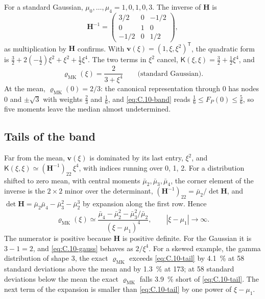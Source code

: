 For a standard Gaussian, $\mu_0, \dots, \mu_4 = 1, 0, 1, 0, 3$. The inverse of $\mathbf{H}$ is
\begin{equation*}
  \mathbf{H}^{-1} = \begin{pmatrix} 3/2 & 0 & -1/2\\ 0 & 1 & 0\\ -1/2 & 0 & 1/2 \end{pmatrix} ,
\end{equation*}
as multiplication by $\mathbf{H}$ confirms. With $\mathbf{v}(\xi) = (1, \xi, \xi^2)^{\mathsf{T}}$, the quadratic form is $\tfrac32 + 2(-\tfrac12)\xi^2 + \xi^2 + \tfrac12\xi^4$. The two terms in $\xi^2$ cancel, $\mathsf{K}(\xi,\xi) = \tfrac32 + \tfrac12\xi^4$, and
\begin{equation}
  \varrho_{\mathrm{MK}}(\xi) = \frac{2}{3 + \xi^4} \qquad \text{(standard Gaussian)} .
  \label{eq:C.10-gauss}
\end{equation}
At the mean, $\varrho_{\mathrm{MK}}(0) = 2/3$: the canonical representation through 0 has nodes $0$ and $\pm\sqrt3$ with weights $\tfrac23$ and $\tfrac16$, and \cref{eq:C.10-band} reads $\tfrac16 \le F_P(0) \le \tfrac56$, so five moments leave the median almost undetermined.

\subsection{Tails of the band}

Far from the mean, $\mathbf{v}(\xi)$ is dominated by its last entry, $\xi^2$, and $\mathsf{K}(\xi,\xi) \simeq (\mathbf{H}^{-1})_{22}\,\xi^4$, with indices running over 0, 1, 2. For a distribution shifted to zero mean, with central moments $\bar\mu_2, \bar\mu_3, \bar\mu_4$, the corner element of the inverse is the $2\times2$ minor over the determinant, $(\mathbf{H}^{-1})_{22} = \bar\mu_2/\det\mathbf{H}$, and $\det\mathbf{H} = \bar\mu_2\bar\mu_4 - \bar\mu_3^2 - \bar\mu_2^3$ by expansion along the first row. Hence
\begin{equation}
  \varrho_{\mathrm{MK}}(\xi) \simeq \frac{\bar\mu_4 - \bar\mu_2^2 - \bar\mu_3^2/\bar\mu_2}{(\xi - \mu_1)^4}, \qquad |\xi - \mu_1| \to \infty .
  \label{eq:C.10-tail}
\end{equation}
The numerator is positive because $\mathbf{H}$ is positive definite. For the Gaussian it is $3 - 1 = 2$, and \cref{eq:C.10-gauss} behaves as $2/\xi^4$. For a skewed example, the gamma distribution of shape 3, the exact $\varrho_{\mathrm{MK}}$ exceeds \cref{eq:C.10-tail} by \SI{4.1}{\percent} at 58 standard deviations above the mean and by \SI{1.3}{\percent} at 173; at 58 standard deviations below the mean the exact $\varrho_{\mathrm{MK}}$ falls \SI{3.9}{\percent} short of \cref{eq:C.10-tail}. The next term of the expansion is smaller than \cref{eq:C.10-tail} by one power of $\xi - \mu_1$.


